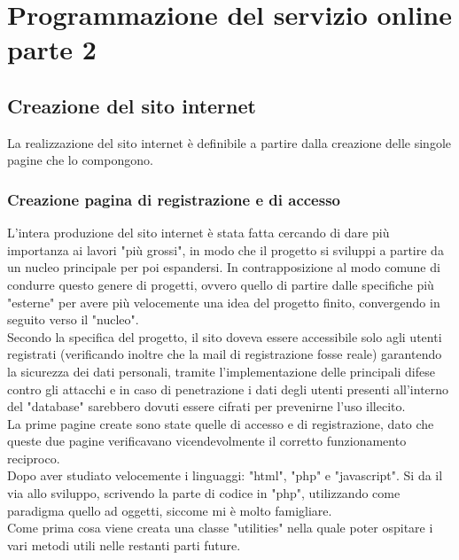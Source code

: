 \chapter{Programmazione del servizio online parte 2}\label{cap:Programmazione del servizio online parte 2}

\section{Creazione del sito internet}\label{sez:Creazione sito internet}
\raggedright
La realizzazione del sito internet è definibile a partire dalla creazione delle singole pagine che lo compongono.\\%

\subsection{Creazione pagina di registrazione e di accesso}
\raggedright
L'intera produzione del sito internet è stata fatta cercando di dare più importanza ai lavori "più grossi", in modo che il progetto si sviluppi a partire da un nucleo principale per poi espandersi. In contrapposizione al  modo comune di  condurre questo genere di progetti, ovvero quello di partire dalle specifiche più "esterne" per  avere più velocemente una idea del progetto finito, convergendo in seguito verso il "nucleo".\\
Secondo la specifica del progetto, il sito doveva essere accessibile solo agli utenti registrati (verificando inoltre che la mail di registrazione fosse reale) garantendo la sicurezza dei dati personali, tramite l'implementazione delle principali difese contro gli attacchi e in caso di penetrazione i dati degli utenti presenti all'interno del "database" sarebbero dovuti essere cifrati per prevenirne l'uso illecito.\\
La prime pagine create sono state quelle di accesso e di registrazione, dato che queste due pagine verificavano vicendevolmente il corretto funzionamento reciproco.\\
\bigskip
Dopo aver studiato velocemente i linguaggi: "html", "php" e "javascript". Si da il via allo sviluppo, scrivendo la parte di codice in "php", utilizzando come paradigma quello ad oggetti, siccome mi è molto famigliare.\\
Come prima cosa viene creata una classe "utilities" nella quale poter ospitare i vari metodi utili nelle restanti parti future.\bigskip\\

